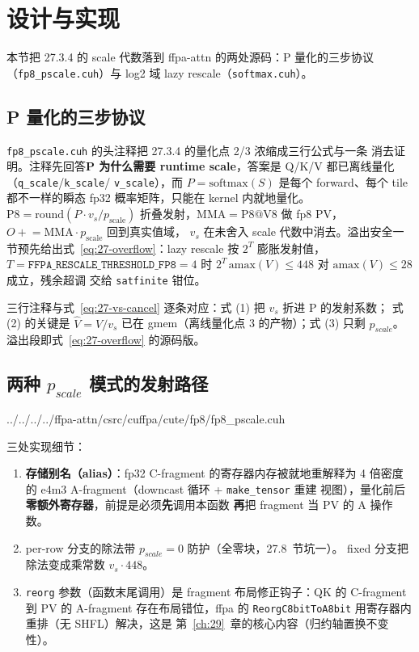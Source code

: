 \section{设计与实现}

本节把 27.3.4 的 scale 代数落到 ffpa-attn 的两处源码：P 量化的三步协议
（\texttt{fp8\_pscale.cuh}）与 log2 域 lazy rescale（\texttt{softmax.cuh}）。

\subsection{P 量化的三步协议}

\texttt{fp8\_pscale.cuh} 的头注释把 27.3.4 的量化点 2/3 浓缩成三行公式与一条
消去证明。注释先回答\textbf{P 为什么需要 runtime
scale}，答案是 Q/K/V 都已离线量化（\texttt{q\_scale}/\texttt{k\_scale}/
\texttt{v\_scale}），而 $P = \mathrm{softmax}(S)$ 是每个 forward、每个 tile
都不一样的瞬态 fp32
概率矩阵，只能在 kernel 内就地量化。$\mathrm{P8} = \mathrm{round}(P \cdot
v_s / p_{\mathrm{scale}})$ 折叠发射，$\mathrm{MMA} = \mathrm{P8} @ \mathrm{V8}$
做 fp8 PV，$O \mathrel{+}= \mathrm{MMA} \cdot p_{\mathrm{scale}}$ 回到真实值域，
$v_s$ 在未舍入 scale 代数中消去。溢出安全一节预先给出式~\ref{eq:27-overflow}：lazy rescale 按
$2^{T}$ 膨胀发射值，$T = \texttt{FFPA\_RESCALE\_THRESHOLD\_FP8} = 4$ 时
$2^{T}\,\mathrm{amax}(V) \le 448$ 对 $\mathrm{amax}(V) \le 28$ 成立，残余超调
交给 \texttt{satfinite} 钳位。

三行注释与式~\ref{eq:27-vs-cancel} 逐条对应：式 (1) 把 $v_s$ 折进 P 的发射系数；
式 (2) 的关键是 $\hat V = V/v_s$ 已在 gmem（离线量化点 3 的产物）；式
(3) 只剩 $p_{scale}$。溢出段即式~\ref{eq:27-overflow} 的源码版。

\subsection{两种 $p_{scale}$ 模式的发射路径}


  {../../../../ffpa-attn/csrc/cuffpa/cute/fp8/fp8_pscale.cuh}

三处实现细节：
\begin{enumerate}[itemsep=2pt,topsep=2pt]
  \item \textbf{存储别名（alias）}：fp32 C-fragment 的寄存器内存被就地重解释为
        4 倍密度的 e4m3 A-fragment（downcast 循环 + \texttt{make\_tensor} 重建
        视图），量化前后\textbf{零额外寄存器}，前提是必须\textbf{先}调用本函数
        \textbf{再}把 fragment 当 PV 的 A 操作数。
  \item per-row 分支的除法带 $p_{scale} = 0$ 防护（全零块，27.8~节坑一）。
        fixed 分支把除法变成乘常数 $v_s \cdot 448$。
  \item \texttt{reorg} 参数（函数末尾调用）是 fragment 布局修正钩子：QK 的
        C-fragment 到 PV 的 A-fragment 存在布局错位，ffpa 的
        \texttt{ReorgC8bitToA8bit} 用寄存器内重排（无 SHFL）解决，这是
        第~\ref{ch:29}~章的核心内容（归约轴置换不变性）。
\end{enumerate}

